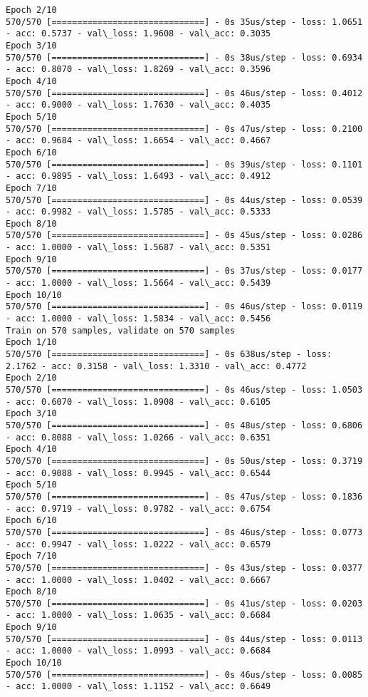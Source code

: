 \documentclass[11pt]{article}
\begin{document}
\begin{Verbatim}[commandchars=\\\{\}]
Epoch 2/10
570/570 [==============================] - 0s 35us/step - loss: 1.0651 - acc: 0.5737 - val\_loss: 1.9608 - val\_acc: 0.3035
Epoch 3/10
570/570 [==============================] - 0s 38us/step - loss: 0.6934 - acc: 0.8070 - val\_loss: 1.8269 - val\_acc: 0.3596
Epoch 4/10
570/570 [==============================] - 0s 46us/step - loss: 0.4012 - acc: 0.9000 - val\_loss: 1.7630 - val\_acc: 0.4035
Epoch 5/10
570/570 [==============================] - 0s 47us/step - loss: 0.2100 - acc: 0.9684 - val\_loss: 1.6654 - val\_acc: 0.4667
Epoch 6/10
570/570 [==============================] - 0s 39us/step - loss: 0.1101 - acc: 0.9895 - val\_loss: 1.6493 - val\_acc: 0.4912
Epoch 7/10
570/570 [==============================] - 0s 44us/step - loss: 0.0539 - acc: 0.9982 - val\_loss: 1.5785 - val\_acc: 0.5333
Epoch 8/10
570/570 [==============================] - 0s 45us/step - loss: 0.0286 - acc: 1.0000 - val\_loss: 1.5687 - val\_acc: 0.5351
Epoch 9/10
570/570 [==============================] - 0s 37us/step - loss: 0.0177 - acc: 1.0000 - val\_loss: 1.5664 - val\_acc: 0.5439
Epoch 10/10
570/570 [==============================] - 0s 46us/step - loss: 0.0119 - acc: 1.0000 - val\_loss: 1.5834 - val\_acc: 0.5456
Train on 570 samples, validate on 570 samples
Epoch 1/10
570/570 [==============================] - 0s 638us/step - loss: 2.1762 - acc: 0.3158 - val\_loss: 1.3310 - val\_acc: 0.4772
Epoch 2/10
570/570 [==============================] - 0s 46us/step - loss: 1.0503 - acc: 0.6070 - val\_loss: 1.0908 - val\_acc: 0.6105
Epoch 3/10
570/570 [==============================] - 0s 48us/step - loss: 0.6806 - acc: 0.8088 - val\_loss: 1.0266 - val\_acc: 0.6351
Epoch 4/10
570/570 [==============================] - 0s 50us/step - loss: 0.3719 - acc: 0.9088 - val\_loss: 0.9945 - val\_acc: 0.6544
Epoch 5/10
570/570 [==============================] - 0s 47us/step - loss: 0.1836 - acc: 0.9719 - val\_loss: 0.9782 - val\_acc: 0.6754
Epoch 6/10
570/570 [==============================] - 0s 46us/step - loss: 0.0773 - acc: 0.9947 - val\_loss: 1.0222 - val\_acc: 0.6579
Epoch 7/10
570/570 [==============================] - 0s 43us/step - loss: 0.0377 - acc: 1.0000 - val\_loss: 1.0402 - val\_acc: 0.6667
Epoch 8/10
570/570 [==============================] - 0s 41us/step - loss: 0.0203 - acc: 1.0000 - val\_loss: 1.0635 - val\_acc: 0.6684
Epoch 9/10
570/570 [==============================] - 0s 44us/step - loss: 0.0113 - acc: 1.0000 - val\_loss: 1.0993 - val\_acc: 0.6684
Epoch 10/10
570/570 [==============================] - 0s 46us/step - loss: 0.0085 - acc: 1.0000 - val\_loss: 1.1152 - val\_acc: 0.6649

\end{Verbatim}
\end{document}
